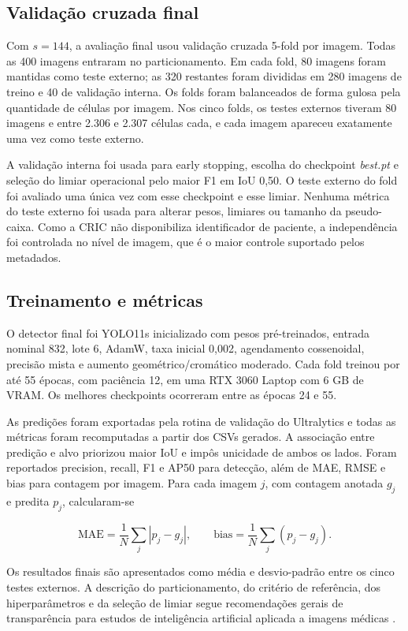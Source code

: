 \subsection{Valida\c{c}\~ao cruzada final}

Com $s=144$, a avalia\c{c}\~ao final usou valida\c{c}\~ao cruzada 5-fold por
imagem. Todas as 400 imagens entraram no particionamento. Em cada fold, 80
imagens foram mantidas como teste externo; as 320 restantes foram divididas em
280 imagens de treino e 40 de valida\c{c}\~ao interna. Os folds foram
balanceados de forma gulosa pela quantidade de c\'elulas por imagem. Nos cinco
folds, os testes externos tiveram 80 imagens e entre 2.306 e 2.307
c\'elulas cada, e cada imagem apareceu exatamente uma vez como teste externo.

A valida\c{c}\~ao interna foi usada para early stopping, escolha do checkpoint
\textit{best.pt} e sele\c{c}\~ao do limiar operacional pelo maior F1 em IoU 0,50.
O teste externo do fold foi avaliado uma \'unica vez com esse checkpoint e esse
limiar. Nenhuma m\'etrica do teste externo foi usada para alterar pesos,
limiares ou tamanho da pseudo-caixa. Como a CRIC n\~ao disponibiliza identificador
de paciente, a independ\^encia foi controlada no n\'ivel de imagem, que \'e o
maior controle suportado pelos metadados.

\subsection{Treinamento e m\'etricas}

O detector final foi YOLO11s \cite{khanam2024yolov11} inicializado com pesos pr\'e-treinados, entrada
nominal 832, lote 6, AdamW, taxa inicial 0,002, agendamento cossenoidal,
precis\~ao mista e aumento geom\'etrico/crom\'atico moderado. Cada fold treinou
por at\'e 55 \'epocas, com paci\^encia 12, em uma RTX 3060 Laptop com 6 GB de
VRAM. Os melhores checkpoints ocorreram entre as \'epocas 24 e 55.

As predi\c{c}\~oes foram exportadas pela rotina de valida\c{c}\~ao do Ultralytics e
todas as m\'etricas foram recomputadas a partir dos CSVs gerados. A
associa\c{c}\~ao entre predi\c{c}\~ao e alvo priorizou maior IoU e
imp\^os unicidade de ambos os lados. Foram reportados precision, recall, F1 e
AP50 \cite{lin2014coco} para detec\c{c}\~ao, al\'em de MAE, RMSE e bias para contagem por imagem.
Para cada imagem $j$, com contagem anotada $g_j$ e predita $p_j$, calcularam-se

\begin{equation}
\mathrm{MAE}=\frac{1}{N}\sum_j|p_j-g_j|,\qquad
\mathrm{bias}=\frac{1}{N}\sum_j(p_j-g_j).
\end{equation}

Os resultados finais s\~ao apresentados como m\'edia e desvio-padr\~ao entre os
cinco testes externos. A descri\c{c}\~ao do particionamento, do crit\'erio de
refer\^encia, dos hiperpar\^ametros e da sele\c{c}\~ao de limiar segue recomenda\c{c}\~oes
gerais de transpar\^encia para estudos de intelig\^encia artificial aplicada a imagens m\'edicas
\cite{mongan2020claim,tejani2024claim}.
